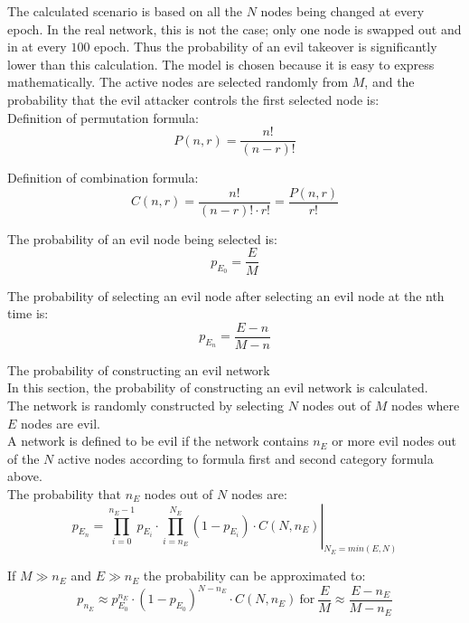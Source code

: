 The calculated scenario is based on all the $N$ nodes being changed at every epoch. In the real network, this is not the case; only one node is swapped out and in at every $100$ epoch. Thus the probability of an evil takeover is significantly lower than this calculation. The model is chosen because it is easy to express mathematically. 
The active nodes are selected randomly from $M$, and the probability that the evil attacker controls the first selected node is:\\
Definition of permutation formula:
\begin{equation}
 P(n,r) = \frac{n!}{(n-r)!}
\end{equation}

Definition of combination formula:
\begin{equation}
 C(n,r) = \frac{n!}{(n-r)! \cdot r!} = \frac{P(n,r)}{r!}
\end{equation}


The probability of an evil node being selected is:
\begin{equation}
 p_{E_0} = \frac{E}{M}
\end{equation}

The probability of selecting an evil node after selecting an evil node at the nth time is:
\begin{equation}
 p_{E_n} = \frac{E-n}{M-n}
\end{equation}


The probability of constructing an evil network\\
In this section, the probability of constructing an evil network is calculated.\\
The network is randomly constructed by selecting $N$ nodes out of $M$ nodes where $E$ nodes are evil.\\
A network is defined to be evil if the network contains $n_E$ or more evil nodes out of the $N$ active nodes according to formula first and second category formula above.\\

The probability that $n_E$ nodes out of $N$ nodes are:
\begin{equation}
 p_{E_n} = \left. \prod_{i=0}^{n_E-1}{p_{E_i}} \cdot \prod_{i=n_E}^{N_E}{(1-p_{E_i}) \cdot C(N,n_E)} \right| _{N_E = min(E,N)}
\end{equation}


If $M \gg n_E$  and $E \gg n_E$  the probability can be approximated to:
\begin{equation}
 p_{n_E} \approx p_{E_0}^{n_E} \cdot (1-p_{E_0})^{N-n_E} \cdot C(N,n_E) ~ \text{for} ~ \frac{E}{M} \approx \frac{E-n_E}{M-n_E}
\end{equation}

